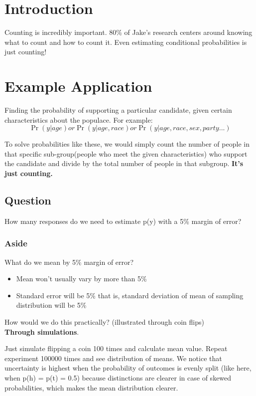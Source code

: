 
\section{Introduction}
Counting is incredibly important. 80\% of Jake's research centers around knowing what to count and how to count it. Even estimating conditional probabilities is just counting!

\section{Example Application}
Finding the probability of supporting a particular candidate, given certain characteristics about the populace. For example:
$$\Pr(y|age) or \Pr(y|age,race) or \Pr(y|age,race,sex,party...) $$

To solve probabilities like these, we would simply count the number of people in that specific sub-group(people who meet the given characteristics) who support the candidate and divide by the total number of people in that subgroup. \textbf{It's just counting.}

\subsection{Question}
How many responses do we need to estimate p(y) with a 5\% margin of error?

\subsubsection{Aside}
What do we mean by 5\% margin of error?
\begin{itemize}
  \item Mean won't usually vary by more than 5\%
  \item Standard error will be 5\% that is, standard deviation of mean of sampling distribution will be 5\%
\end{itemize}

How would we do this practically? (illustrated through coin flips)\\
\textbf{Through simulations}. 


Just simulate flipping a coin 100 times and calculate mean value. Repeat experiment 100000 times and see distribution of means. 
We notice that uncertainty is highest when the probability of outcomes is evenly split (like here, when p(h) = p(t) = 0.5) because distinctions are clearer in case of skewed probabilities, which makes the mean distribution clearer.

